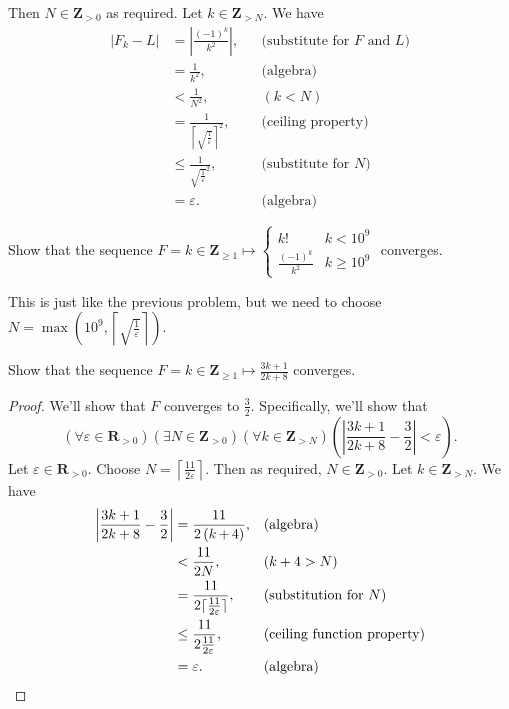 \documentclass[12pt, fleqn, answers]{exam}
\newcommand{\reals}{\mathbf{R}}
\newcommand{\integers}{\mathbf{Z}}
\begin{document}
\begin{questions}
\begin{solution}
Then $N \in \integers_{>0}$ as required.  Let $k \in \integers_{> N}$. We have
\begin{align*}
   |F_k -L | &= \left|\frac{(-1)^k}{k^2} \right|,&& \text{(substitute for $F$ and $L$)} \\
                 &= \frac{1}{k^2}, &&\text{(algebra)}\\
                 &< \frac{1}{N^2}, &&(k < N) \\
                 &=  \frac{1}{\left \lceil \sqrt{\frac{1}{\varepsilon}} \right \rceil^2}, && \text{(ceiling property)}\\
                 &\leq \frac{1}{\sqrt{\frac{1}{\varepsilon}}^2}, && \text{(substitute for $N$)}\\
                 &= \varepsilon. &&\text{(algebra)}
\end{align*}
\end{solution}
\question Show that the sequence $F = k \in \integers_{\geq 1} \mapsto \begin{cases} k! & k < 10^9 \\
\frac{(-1)^k}{k^2} & k \geq 10^9 \end{cases}$ converges.

\begin{solution} This is just like the previous problem, but we need to choose $N = \max(10^9,  \left \lceil \sqrt{\frac{1}{\varepsilon}} \right \rceil)$.

\end{solution}

\question Show that the sequence $F = k \in \integers_{\geq 1} \mapsto \frac{3 k+ 1}{2 k + 8}$ converges.

\begin{solution}
\begin{proof} We'll show that $F$ converges to $\frac{3}{2}$. Specifically,
  we'll show that 
  \begin{equation*}
    \left(\forall \varepsilon \in \reals_{> 0} \right)
    \left(\exists N \in \integers_{> 0} \right)
    \left(\forall k \in \integers_{> N} \right)
   \left( \left| \frac{ 3k+1}{2 k + 8} - \frac{3}{2} \right| < \varepsilon \right).
  \end{equation*}
Let $\varepsilon \in \reals_{> 0}$. Choose $N = \left \lceil \frac{11}{2 \varepsilon} \right \rceil$.
Then as required, $N \in \integers_{> 0}$. Let $k \in \integers_{>N}$. 
We have
\begin{align*}
 \left| \frac{ 3k+1}{2 k + 8} - \frac{3}{2} \right| &= \frac{11}{2 \left( k\operatorname{+}4\right) }, 
                &&\mbox{(\text{algebra})}\\
                &< \frac{11}{2 N}, && (k + 4 > N) \\
                &=  \frac{11}{2 \lceil \frac{11}{2 \varepsilon} \rceil}, && \mbox{(substitution for $N$)} \\
                &\leq \frac{11}{2 \frac{11}{2 \varepsilon}},  && \mbox{(ceiling function property)} \\
                &=  \varepsilon. &&\mbox{(\text{algebra})} \qedhere
\end{align*}


\end{proof}
\end{solution}
\end{questions}
\end{document}
